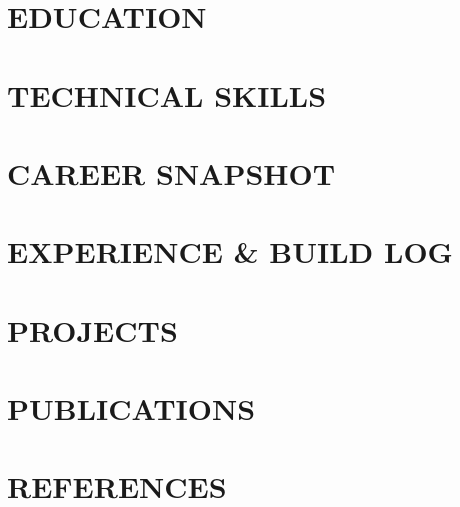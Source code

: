 \documentclass[14pt]{prometheus_cv}
\begin{document}
\thispagestyle{empty}					%
\pagestyle{fancy}			 		%

\vspace*{-1cm}

\centering


\vspace*{0.4cm}
\section{EDUCATION}


\section{TECHNICAL SKILLS}


\section{CAREER SNAPSHOT}


\section{EXPERIENCE \& BUILD LOG}


\section{PROJECTS}


\section{PUBLICATIONS}


\section{REFERENCES}

\end{document}
